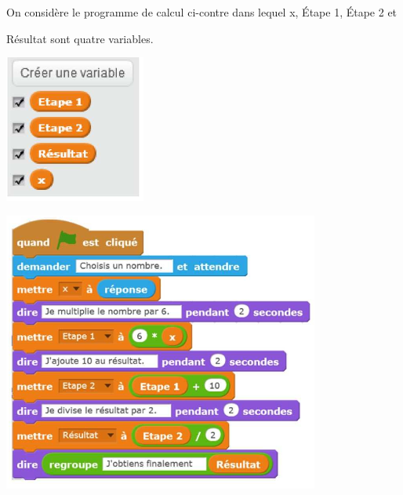 
\parbox{0.22\linewidth}{On considère le programme de calcul ci-contre dans lequel x, Étape 1,
Étape 2 et 

Résultat sont quatre variables.}
\parbox{0.28\linewidth}{
\includegraphics[scale=1]{NF-42.png} 
}
\parbox{0.48\linewidth}{
\includegraphics[scale=1]{NF-43.png}
}
\medskip

